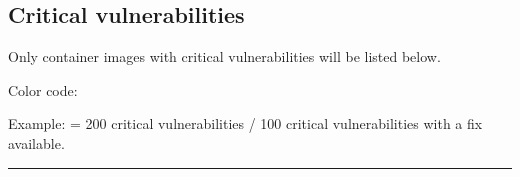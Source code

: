 


\subsection{Critical vulnerabilities}
Only container images with critical vulnerabilities will be listed below.


\vskip10pt

Color code:

Example: 
 = 
200 critical vulnerabilities / 100 critical vulnerabilities with a fix available.
\par

\begin{center}
\rule{0.5\linewidth}{1pt}
\end{center}



